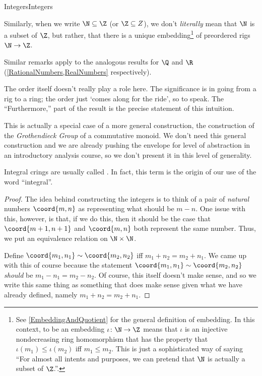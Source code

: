 \begin{thm}{Integers}{Integers}
\begin{rmk}
Similarly, when we write $\N \subseteq \Z$ (or $\Z \subseteq Z$), we don't \emph{literally} mean that $\N$ is a subset of $\Z$, but rather, that there is a unique embedding\footnote{See \cref{EmbeddingAndQuotient} for the general definition of embedding.  In this context, to be an embedding $\iota \colon \N \rightarrow \Z$ means that $\iota$ is an injective nondecreasing ring homomorphism that has the property that $\iota (m_1)\leq \iota (m_2)$ iff $m_1\leq m_2$.  This is just a sophisticated way of saying ``For almost all intents and purposes, we can pretend that $\N$ is actually a subset of $\Z$.''.} of preordered rigs $\N \rightarrow \Z$.

Similar remarks apply to the analogous results for $\Q$ and $\R$ (\cref{RationalNumbers,RealNumbers} respectively).
\end{rmk}
\begin{rmk}
The order itself doesn't really play a role here.  The significance is in going from a rig to a ring; the order just `comes along for the ride', so to speak.  The ``Furthermore,\textellipsis'' part of the result is the precise statement of this intuition.
\end{rmk}
\begin{rmk}
This is actually a special case of a more general construction, the construction of the \emph{Grothendieck Group} of a commutative monoid.  We don't need this general construction and we are already pushing the envelope for level of abstraction in an introductory analysis course, so we don't present it in this level of generality.
\end{rmk}
\begin{rmk}
Integral crings are usually called .  In fact, this term is the origin of our use of the word ``integral''.
\end{rmk}
\begin{proof}
The idea behind constructing the integers is to think of a pair of \emph{natural} numbers $\coord{m,n}$ as representing what should be $m-n$.  One issue with this, however, is that, if we do this, then it should be the case that $\coord{m+1,n+1}$ and $\coord{m,n}$ both represent the same number.  Thus, we put an equivalence relation on $\N \times \N$.

Define $\coord{m_1,n_1}\sim \coord{m_2,n_2}$ iff $m_1+n_2=m_2+n_1$.  We came up with this of course because the statement $\coord{m_1,n_1}\sim \coord{m_2,n_2}$ \emph{should} be $m_1-n_1=m_2-n_2$.  Of course, this itself doesn't make sense, and so we write this same thing as something that does make sense given what we have already defined, namely $m_1+n_2=m_2+n_1$.


\end{proof}
\end{thm}

